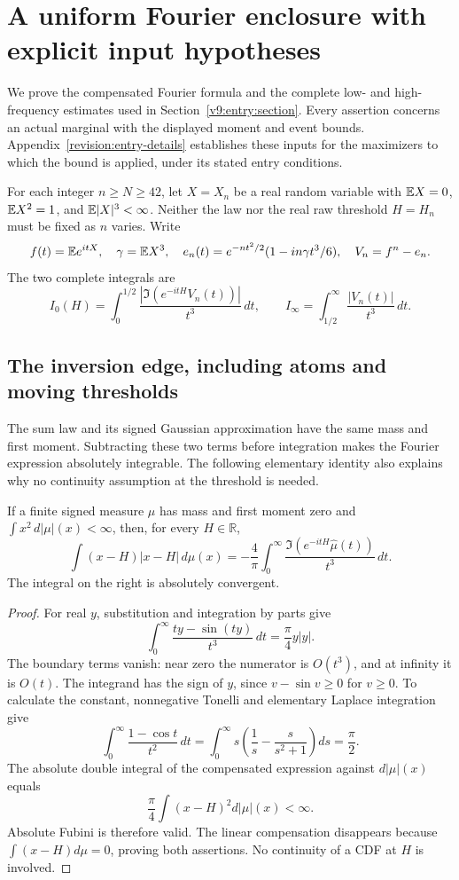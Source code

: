\section{A uniform Fourier enclosure with explicit input hypotheses}
\label{v9:fourier:section}

We prove the compensated Fourier formula and the complete low- and
high-frequency estimates used in Section~\ref{v9:entry:section}.
Every assertion concerns an actual marginal with the displayed moment
and event bounds. Appendix~\ref{revision:entry-details} establishes these inputs for the
maximizers to which the bound is applied, under its stated entry conditions.

For each integer $n\ge N\ge42$, let $X=X_n$ be a real random variable with
$\mathbb E X=0$, $\mathbb E X^2=1$, and $\mathbb E|X|^3<\infty$.
Neither the law nor the real raw threshold $H=H_n$
must be fixed as $n$ varies. Write
\[
 f(t)=\mathbb E e^{itX},\quad \gamma=\mathbb E X^3,\quad
 e_n(t)=e^{-nt^2/2}(1-in\gamma t^3/6),\quad V_n=f^n-e_n.
\]
The two complete integrals are
\[
 I_0(H)=\int_0^{1/2}\frac{|\Im(e^{-itH}V_n(t))|}{t^3}\,dt,
 \qquad I_\infty=\int_{1/2}^\infty\frac{|V_n(t)|}{t^3}\,dt.
\]

\subsection{The inversion edge, including atoms and moving thresholds}

The sum law and its signed Gaussian approximation have the same mass
and first moment. Subtracting these two terms before integration makes
the Fourier expression absolutely integrable. The following elementary
identity also explains why no continuity assumption at the threshold is
needed.

\begin{lemma}\label{v9:fourier:inversion}
If a finite signed measure $\mu$ has mass and first moment zero and
$\int x^2\,d|\mu|(x)<\infty$, then, for every $H\in\mathbb R$,
\[
 \int(x-H)|x-H|\,d\mu(x)
 =-\frac4\pi\int_0^\infty
 \frac{\Im(e^{-itH}\widehat\mu(t))}{t^3}\,dt.
\]
The integral on the right is absolutely convergent.
\end{lemma}
\begin{proof}
For real $y$, substitution and integration by parts give
\[
 \int_0^\infty\frac{ty-\sin(ty)}{t^3}\,dt=\frac\pi4 y|y|.
\]
The boundary terms vanish: near zero the numerator is $O(t^3)$, and
at infinity it is $O(t)$. The integrand has the sign of $y$, since
$v-\sin v\ge0$ for $v\ge0$. To calculate the constant, nonnegative
Tonelli and elementary Laplace integration give
\[
 \int_0^\infty\frac{1-\cos t}{t^2}\,dt
 =\int_0^\infty s\left(\frac1s-\frac{s}{s^2+1}\right)ds
 =\frac\pi2.
\]
The absolute double integral of the compensated expression against
$d|\mu|(x)$ equals
\[
 \frac\pi4\int(x-H)^2d|\mu|(x)<\infty.
\]
Absolute Fubini is therefore valid. The linear compensation disappears
because $\int(x-H)d\mu=0$, proving both assertions. No continuity of a
CDF at $H$ is involved.
\end{proof}

